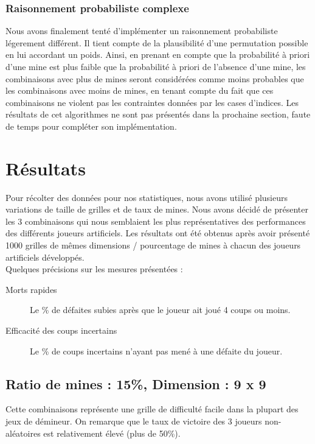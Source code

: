 \documentclass{article}
\begin{document}
\subsubsection{Raisonnement probabiliste complexe}
Nous avons finalement tenté d'implémenter un raisonnement probabiliste légerement différent.
Il tient compte de la plausibilité d’une permutation possible en lui accordant un poids. 
Ainsi, en prenant en compte que la probabilité à priori d'une mine est plus faible 
que la probabilité à priori de l'absence d'une mine, les combinaisons avec plus de mines
seront considérées comme moins probables que les combinaisons avec moins de mines, en tenant compte du fait que
ces combinaisons ne violent pas les contraintes données par les cases d'indices.
Les résultats de cet algorithmes ne sont pas présentés dans la prochaine section, faute de temps pour 
compléter son implémentation.

\section{Résultats}
Pour récolter des données pour nos statistiques, nous avons utilisé plusieurs variations de taille de grilles et de taux de mines. Nous avons
décidé de présenter les 3 combinaisons qui nous semblaient les plus représentatives des performances des différents joueurs artificiels.
Les résultats ont été obtenus après avoir présenté 1000 grilles de mêmes dimensions / pourcentage de mines à chacun des joueurs artificiels 
développés. \\

Quelques précisions sur les mesures présentées : 
\begin{description}
	\item[Morts rapides] Le \% de défaites subies après que le joueur ait joué 4 coups ou moins.
	\item[Efficacité des coups incertains] Le \% de coups incertains n'ayant pas mené à une défaite du joueur.
\end{description}

\subsection{Ratio de mines : 15\%, Dimension : 9 x 9}

Cette combinaisons représente une grille de difficulté facile dans la plupart des jeux de démineur. On remarque que le taux de victoire
des 3 joueurs non-aléatoires est relativement élevé (plus de 50\%).
\end{document}
